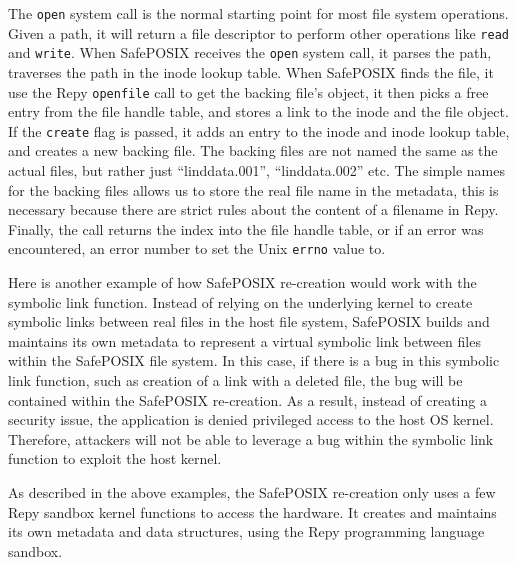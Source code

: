 The \texttt{open} system call is the normal starting point for most file system operations. 
Given a path, it will return a file descriptor to perform other operations like \texttt{read} and \texttt{write}. 
When SafePOSIX receives the \texttt{open} system call, it parses the path, 
traverses the path in the inode lookup table. 
When SafePOSIX finds the file, it use the Repy \texttt{openfile} call to get the backing file's object, 
it then picks a free entry from the file handle table, and stores a link to the inode and the file object. 
If the \texttt{create} flag is passed, it adds an entry to the inode and inode lookup table, and creates a new backing file. 
The backing files are not named the same as the actual files, but rather just ``linddata.001'', ``linddata.002'' etc. 
The simple names for the backing files allows us to store the real file name in the metadata, 
this is necessary because there are strict rules about the content of a filename in Repy. 
Finally, the call returns the index into the file handle table, or if an error was encountered, an error number to set the Unix \texttt{errno} value to.

Here is another example of how SafePOSIX re-creation would work with the symbolic link function. 
Instead of relying on the underlying kernel to create symbolic links between real files 
in the host file system, SafePOSIX builds and maintains its own metadata to represent a virtual symbolic link 
between files within the SafePOSIX file system. In this case, if there is a bug in this symbolic link function, 
such as creation of a link with a deleted file, the bug will be contained within the SafePOSIX re-creation. 
As a result, instead of creating a security issue, the application is denied privileged access to the host OS kernel. 
Therefore, attackers will not be able to leverage a bug within the symbolic link function to exploit the host kernel.  

As described in the above examples, the SafePOSIX re-creation only uses a few Repy sandbox kernel functions to access the hardware. 
It creates and maintains its own metadata and data structures, using the Repy programming language sandbox. 
